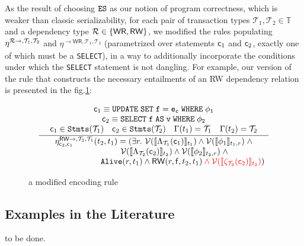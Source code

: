 \documentclass{vldb}
\begin{document}
As the result of choosing $\texttt{ES}$ as our notion of program correctness, which is weaker than classic
serializability, for each pair of transaction types $\mathcal{T}_1,\mathcal{T}_2
\in \mathbb{T}$ and a dependency type $\mathcal{R}\in\{\mathsf{WR},\mathsf{RW}\}$,  we modified the 
rules populating $\eta^{\mathcal{R}\rightarrow,\mathcal{T}_1,\mathcal{T}_2}_{} $ and 
$\eta^{\rightarrow\mathsf{WR},\mathcal{T}_1,\mathcal{T}_2}_{} $ (parametrized
over statements $\mathsf{c}_1$ and $\mathsf{c}_2$, exactly one of which must be a
\texttt{SELECT}), in a way to additionally
incorporate the conditions under which the \texttt{SELECT} statement is not
dangling. 
For example, our version of the rule that constructs the necessary entailments 
of an \textrm{RW} dependency relation is presented in the fig.\ref{fig:rwtus}:


\begin{figure}[h]
	$$
	\RULE
		{\mcmd_1 \equiv \tt{UPDATE\; SET}\; f = e_c\; \tt{WHERE}\; \phi_1 \\ 
		 \mcmd_2 \equiv \tt{SELECT} \; f \;\tt{AS}\; v\; \tt{WHERE}\; \phi_2 \\ 
		 \mcmd_1 \in  \C{Stmts}(\mathcal{T}_1) \quad \mcmd_2 \in  \C{Stmts}(\mathcal{T}_2) \quad \Gamma(t_1) = \mathcal{T}_1 \quad \Gamma(t_2) = \mathcal{T}_2}
		{ \eta_{\mcmd_2, \mcmd_1}^{\F{RW}\rightarrow,\mathcal{T}_2,\mathcal{T}_1}(t_2, t_1) =  
		 (\exists r.\ 
		 \mathcal{V}(\llbracket \Lambda_{\mathcal{T}_1}(\mcmd_1) \rrbracket_{t_1}) 
		  \wedge \mathcal{V}(\llbracket \phi_1 \rrbracket_{t_1, r} ) 
		 \; \wedge  \\ \myQQuad{5} \mathcal{V}(\llbracket  \Lambda_{\mathcal{T}_2}(\mcmd_2) \rrbracket_{t_2}) 
	    	\wedge \mathcal{V}(\llbracket \phi_2 \rrbracket_{t_2, r}) 
		 \; \wedge \\ \myQQuad{7}\C{Alive}(r, t_1)  \wedge \F{RW}(r, \F{f}, t_2, t_1)
 				\color{red} 
					\wedge \mathcal{V}(\llbracket  \zeta_{\mathcal{T}_2}(\mcmd_2) \rrbracket_{t_2}) 

 				\color{black})
	
}
	$$

\caption{a modified encoding rule}
\label{fig:rwtus}
\end{figure}






\subsection{Examples in the Literature}
to be done.
\end{document}
